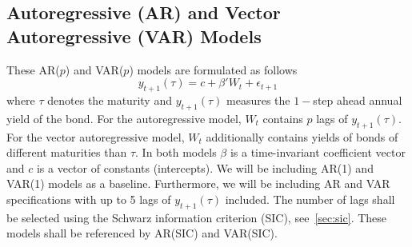 \subsection{Autoregressive (AR) and Vector Autoregressive (VAR) Models}
\label{sec:arvar}
These AR($p$) and VAR($p$) models are formulated as follows
\begin{equation}
	y_{t+1}(\tau) = c + \beta' W_t + \epsilon_{t+1}
\end{equation}
where $\tau$ denotes the maturity and $y_{t+1}(\tau)$ measures the $1-$step ahead annual yield of the bond. For the autoregressive model, $W_t$ contains $p$ lags of $y_{t+1}(\tau)$. For the vector autoregressive model, $W_t$ additionally contains yields of bonds of different maturities than $\tau$. In both models $\beta$ is a time-invariant coefficient vector and $c$ is a vector of constants (intercepts). We will be including AR(1) and VAR(1) models as a baseline. Furthermore, we will be including AR and VAR specifications with up to 5 lags of $y_{t+1}(\tau)$ included. The number of lags shall be selected using the Schwarz information criterion (SIC), see~\cref{sec:sic}. These models shall be referenced by AR(SIC) and VAR(SIC). 

